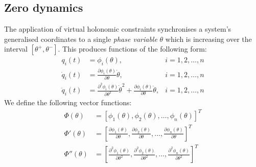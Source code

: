 \subsection{Zero dynamics}
The application of virtual holonomic constraints synchronises a system's generalised coordinates to a single \textit{phase variable} $\theta$ which is increasing over the interval $[\theta^+, \theta^-]$. This produces functions of the following form:
\begin{subequations}
\label{eqn:virtconstraint}
\begin{align}
	q_i(t) &= \phi_i\left(\theta\right), &i = 1,2,\ldots,n \\
	\dot{q}_i(t) &= \frac{\partial\phi_i\left(\theta\right)}{\partial\theta}\dot{\theta}, &i = 1,2,\ldots,n \\
	\ddot{q}_i(t) &= \frac{\partial^2\phi_i\left(\theta\right)}{\partial\theta^2}\dot{\theta}^2 + \frac{\partial\phi_i\left(\theta\right)}{\partial\theta}\ddot{\theta}, &i = 1,2,\ldots,n
\end{align}
\end{subequations}
We define the following vector functions:
\begin{align*}
	\Phi\left(\theta\right) &= \left[ \phi_1\left(\theta\right), \phi_2\left(\theta\right), \ldots,
	\phi_n\left(\theta\right)\right]^T \\
	\Phi'\left(\theta\right) &= \left[ \frac{\partial\phi_1\left(\theta\right)}{\partial\theta},
	\frac{\partial\phi_2\left(\theta\right)}{\partial\theta}, \ldots ,
	\frac{\partial\phi_n\left(\theta\right)}{\partial\theta} \right]^T \\
	\Phi''\left(\theta\right) &= \left[ \frac{\partial^2\phi_1\left(\theta\right)}{\partial\theta^2},
	\frac{\partial^2\phi_2\left(\theta\right)}{\partial\theta^2}, \ldots ,
	\frac{\partial^2\phi_n\left(\theta\right)}{\partial\theta^2} \right]^T
\end{align*}

